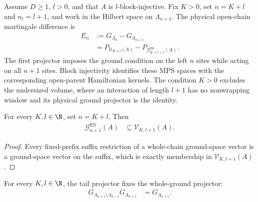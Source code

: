 \begin{definition}
    \label{def:open_chain_martingale_difference_es}
    \leanok
    Assume $D\geq1$, $l>0$, and that $A$ is $l$-block-injective.  Fix
    $K>0$, set $n=K+l$ and $n_l=l+1$, and work in the Hilbert space on
    $\Lambda_{n+1}$.  The physical open-chain martingale difference is
    \begin{align}
        E_n
         & :=G_{\Lambda_n}-G_{\Lambda_{n+1}} \\
         & =P_{\mathcal U_{K+l}(A)}
        -P_{\mathcal G_{K+l+1}^{\mathrm{ES}}(A)}.
        \label{eq:open_chain_martingale_difference_es}
    \end{align}
    The first projector imposes the ground condition on the left $n$ sites
    while acting on all $n+1$ sites.  Block injectivity identifies these MPS
    spaces with the corresponding open-parent Hamiltonian kernels.  The
    condition $K>0$ excludes the undersized volume, where an interaction of
    length $l+1$ has no nonwrapping window and its physical ground projector is
    the identity.
\end{definition}

\begin{lemma}
    \label{lem:whole_ground_space_le_c3_tail_space}
    \leanok
    For every $K,l\in\N$, set $n=K+l$.  Then
    \begin{align}
        \mathcal G_{n+1}^{\mathrm{ES}}(A)
         & \subseteq \mathcal V_{K,l+1}(A).
        \label{eq:whole_ground_space_le_c3_tail_space}
    \end{align}
\end{lemma}

\begin{proof}
    \leanok
    Every fixed-prefix suffix restriction of a whole-chain ground-space vector
    is a ground-space vector on the suffix, which is exactly membership in
    $\mathcal V_{K,l+1}(A)$.
\end{proof}

\begin{lemma}
    \label{lem:reverse_c3_projector_composition}
    \leanok
    For every $K,l\in\N$, the tail projector fixes the whole-ground projector:
    \begin{align}
        G_{\Lambda_{n+1}\setminus\Lambda_{n-l}}G_{\Lambda_{n+1}}
         & =G_{\Lambda_{n+1}}.
        \label{eq:reverse_c3_projector_composition}
    \end{align}
\end{lemma}

